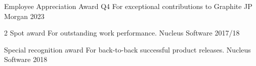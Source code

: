 


\begin{cvhonors}

\cvhonor
    {Employee Appreciation Award Q4} %
    {For exceptional contributions to Graphite} %
    {JP Morgan} %
    {2023} %
    
  \cvhonor
    {2 Spot award} %
    {For outstanding work performance.} %
    {Nucleus Software} %
    {2017/18} %

\cvhonor
    {Special recognition award} %
    {For back-to-back successful product releases.} %
    {Nucleus Software} %
    {2018} %

\end{cvhonors}


